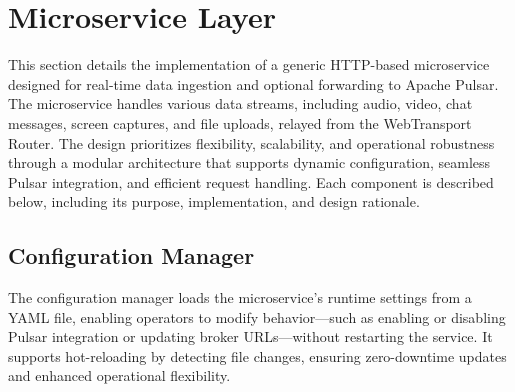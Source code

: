




\section{Microservice Layer}
This section details the implementation of a generic HTTP-based microservice designed for real-time data ingestion and optional forwarding to Apache Pulsar. The microservice handles various data streams, including audio, video, chat messages, screen captures, and file uploads, relayed from the WebTransport Router. The design prioritizes flexibility, scalability, and operational robustness through a modular architecture that supports dynamic configuration, seamless Pulsar integration, and efficient request handling. Each component is described below, including its purpose, implementation, and design rationale.

\subsection{Configuration Manager}
The configuration manager loads the microservice’s runtime settings from a YAML file, enabling operators to modify behavior—such as enabling or disabling Pulsar integration or updating broker URLs—without restarting the service. It supports hot-reloading by detecting file changes, ensuring zero-downtime updates and enhanced operational flexibility.

